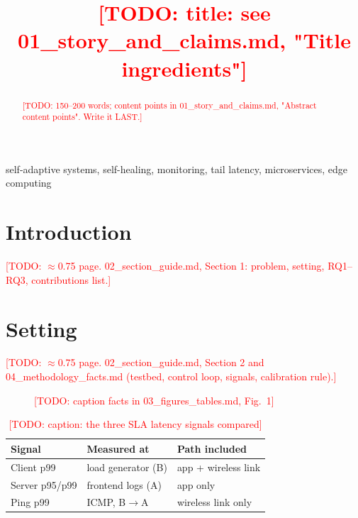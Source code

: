\documentclass[conference,10pt]{IEEEtran}
\newcommand{\todo}[1]{\textcolor{red}{[TODO: #1]}}
\begin{document}
\title{\todo{title: see 01\_story\_and\_claims.md, "Title ingredients"}}

\author{
}

\maketitle

\begin{abstract}
\todo{150--200 words; content points in 01\_story\_and\_claims.md, "Abstract content points". Write it LAST.}
\end{abstract}

\begin{IEEEkeywords}
self-adaptive systems, self-healing, monitoring, tail latency, microservices, edge computing
\end{IEEEkeywords}

\section{Introduction}\label{sec:intro}
\todo{$\approx$0.75 page. 02\_section\_guide.md, Section 1: problem, setting, RQ1--RQ3, contributions list.}

\section{Setting}\label{sec:setting}
\todo{$\approx$0.75 page. 02\_section\_guide.md, Section 2 and 04\_methodology\_facts.md (testbed, control loop, signals, calibration rule).}

\begin{figure}[t]
  \centering
  \caption{\todo{caption facts in 03\_figures\_tables.md, Fig.~1}}
  \label{fig:testbed}
\end{figure}

\begin{table}[t]
  \centering
  \caption{\todo{caption: the three SLA latency signals compared}}
  \label{tab:signals}
  \small
  \begin{tabular}{@{}lll@{}}
    \toprule
    Signal & Measured at & Path included \\
    \midrule
    Client p99 & load generator (B) & app + wireless link \\
    Server p95/p99 & frontend logs (A) & app only \\
    Ping p99 & ICMP, B$\rightarrow$A & wireless link only \\
    \bottomrule
  \end{tabular}
\end{table}
\end{document}
